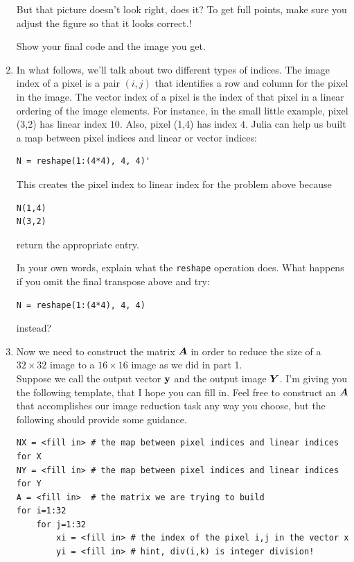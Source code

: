 \documentclass[]{article}
\begin{document}
\begin{enumerate}
  But that picture doesn't look right, does it? To get full points, make
  sure you adjust the figure so that it looks correct.!

  Show your final code and the image you get.
\item
  In what follows, we'll talk about two different types of indices. The
  image index of a pixel is a pair \((i,j)\) that identifies a row and
  column for the pixel in the image. The vector index of a pixel is the
  index of that pixel in a linear ordering of the image elements. For
  instance, in the small little example, pixel (3,2) has linear index
  \(10\). Also, pixel (1,4) has index \(4\). Julia can help us built a
  map between pixel indices and linear or vector indices:

\begin{verbatim}
N = reshape(1:(4*4), 4, 4)'
\end{verbatim}

  This creates the pixel index to linear index for the problem above
  because

\begin{verbatim}
N(1,4) 
N(3,2)
\end{verbatim}

  return the appropriate entry.

  In your own words, explain what the \texttt{reshape} operation does.
  What happens if you omit the final transpose above and try:

\begin{verbatim}
N = reshape(1:(4*4), 4, 4)
\end{verbatim}

  instead?
\item
  Now we need to construct the matrix \(\boldsymbol{A}\) in order to reduce the
  size of a \(32 \times 32\) image to a \(16 \times 16\) image as we did
  in part 1.\\
  Suppose we call the output vector \(\boldsymbol{\mathrm{y}}\) and the output image
  \(\boldsymbol{Y}\). I'm giving you the following template, that I hope you can
  fill in. Feel free to construct an \(\boldsymbol{A}\) that accomplishes our image
  reduction task any way you choose, but the following should provide
  some guidance.

\begin{verbatim}
NX = <fill in> # the map between pixel indices and linear indices for X
NY = <fill in> # the map between pixel indices and linear indices for Y
A = <fill in>  # the matrix we are trying to build
for i=1:32
    for j=1:32    
        xi = <fill in> # the index of the pixel i,j in the vector x
        yi = <fill in> # hint, div(i,k) is integer division!


\end{verbatim}
\end{enumerate}
\end{document}
